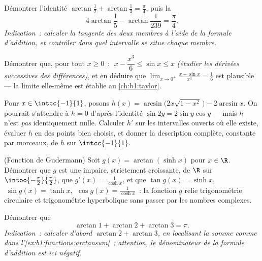 \begin{exercise}[$\star\star$]\label{exo:b1:functions:8}
Démontrer l'identité $\arctan\frac{1}{2} + \arctan\frac{1}{3} =
\frac{\pi}{4}$, puis la 
\[
4\arctan\frac 15 - \arctan\frac{1}{239} = \frac{\pi}{4}.
\]
\emph{Indication~: calculer la tangente des deux membres à l'aide de
la formule d'addition, et contrôler dans quel intervalle se situe
chaque membre.}
\end{exercise}

\begin{exercise}[$\star\star$]\label{exo:b1:functions:9}
Démontrer que, pour tout $x \geq 0$~: $\;x - \dfrac{x^3}{6} \leq
\sin x \leq x$ \emph{(étudier les dérivées successives des
différences)}, et en déduire que $\lim_{x \to 0^+} \frac{x - \sin
x}{x^3} = \frac 16$ est plausible --- la limite elle-même est établie
au \cref{ch:b1:taylor}.
\end{exercise}

\begin{exercise}[$\star\star\star$]\label{exo:b1:functions:10}
Pour $x \in \intcc{-1}{1}$, posons
$h(x) = \arcsin\bigl(2x\sqrt{1 - x^2}\,\bigr) - 2\arcsin x$. On
pourrait s'attendre à $h = 0$ d'après l'identité $\sin 2y = 2\sin
y\cos y$ --- mais $h$ n'est \emph{pas} identiquement nulle. Calculer
$h'$ sur les intervalles ouverts où elle existe, évaluer $h$ en des
points bien choisis, et donner la description complète, constante par
morceaux, de $h$ sur $\intcc{-1}{1}$.
\end{exercise}

\begin{exercise}[$\star\star\star$]\label{exo:b1:functions:11}
(Fonction de Gudermann) Soit $g(x) = \arctan(\sinh x)$ pour $x \in
\R$. Démontrer que $g$ est une  impaire, strictement
croissante, de $\R$ sur $\intoo{-\frac\pi2}{\frac\pi2}$, que
$g'(x) = \frac{1}{\cosh x}$, et que $\tan g(x) = \sinh x$,
$\;\sin g(x) = \tanh x$, $\;\cos g(x) = \frac{1}{\cosh x}$~: la
fonction $g$ relie trigonométrie circulaire et trigonométrie
hyperbolique sans passer par les nombres complexes.
\end{exercise}

\begin{exercise}[$\star\star$]\label{exo:b1:functions:12}
Démontrer que
\[
\arctan 1 + \arctan 2 + \arctan 3 = \pi .
\]
\emph{Indication~: calculer d'abord $\arctan 2 + \arctan 3$, en
localisant la somme comme dans l'\cref{ex:b1:functions:arctansum}~;
attention, le dénominateur de la formule d'addition est ici négatif.}
\end{exercise}

